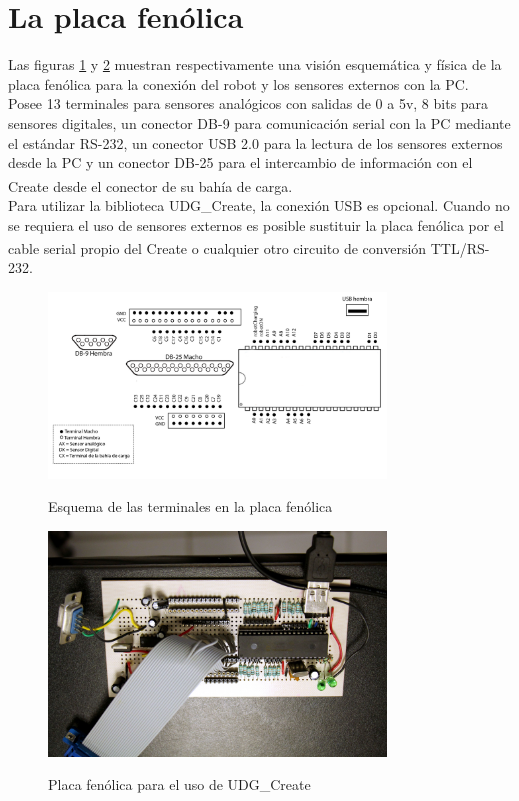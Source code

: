 \documentclass[letterpaper,openright,12pt]{book}
\begin{document}
\section{La placa fenólica}
Las figuras \ref{fig:pcbSchematics} y \ref{fig:pcb} muestran respectivamente una visión esquemática y física de la placa fenólica para la conexión del robot y los sensores externos con la PC.\\
Posee 13 terminales para sensores analógicos con salidas de 0 a 5v, 8 bits para sensores digitales, un conector DB-9 para comunicación serial con la PC mediante el estándar RS-232, un conector USB 2.0 para la lectura de los sensores externos desde la PC y un conector DB-25 para el intercambio de información con el Create\textsuperscript{\textregistered} desde el conector de su bahía de carga.\\
Para utilizar la biblioteca UDG\_Create, la conexión USB es opcional. Cuando no se requiera el uso de sensores externos es posible sustituir la placa fenólica por el cable serial propio del Create\textsuperscript{\textregistered} o cualquier otro circuito de conversión TTL/RS-232.\\
\begin{figure}[h]
\begin{center}
\includegraphics[width=0.8\textwidth]{figures/esquemaPlaca.png}
\caption{Esquema de las terminales en la placa fenólica}
\centering
\label{fig:pcbSchematics}
\end{center}
\end{figure} 

\begin{figure}[h]
\begin{center}
\includegraphics[width=0.8\textwidth]{figures/pcb.jpg}
\caption{Placa fenólica para el uso de UDG\_Create}
\centering
\label{fig:pcb}
\end{center}
\end{figure} 
\end{document}
